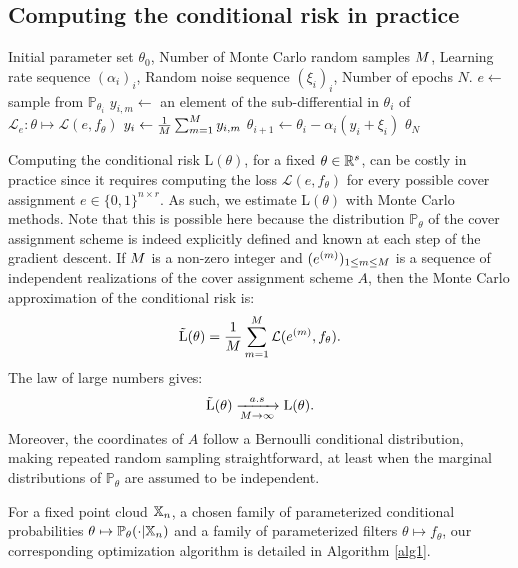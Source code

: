 \subsection{Computing the conditional risk in practice}

\begin{algorithm}[H]
\caption{Soft Mapper Optimization Algorithm}\label{alg1}
\begin{algorithmic}
\Require Initial parameter set $\theta_0$, Number of Monte Carlo random samples $M$, Learning rate sequence $(\alpha_i)_i$, Random noise sequence $(\xi_i)_i$, Number of epochs $N$.
    \State $e \gets $ sample from $\mathbb{P}_{\theta_i}$ %
    \State $y_{i,m} \gets$ an element of the sub-differential in $\theta_i$ of $\mathcal{L}_e\colon\theta\mapsto \mathcal{L}(e,f_\theta)$
\EndFor
\State $y_i \gets \frac{1}{M}\sum_{m=1}^{M}y_{i,m}$
\State $\theta_{i+1}\gets \theta_i -\alpha_i(y_i+\xi_i)$
\EndFor
{} $\theta_N$
\end{algorithmic}
\end{algorithm}


Computing the conditional risk L$(\theta)$, for a fixed $\theta\in\mathbb{R}^s$, can be costly in practice since it requires computing the loss $\mathcal{L}(e,f_\theta)$ for every possible cover assignment $e\in\{0,1\}^{n\times r}$. As such, we estimate L$(\theta)$ with Monte Carlo methods. Note that this is possible here because the distribution $\mathbb{P}_\theta$  of the cover assignment scheme is indeed explicitly defined and known at each step of the gradient descent. If $M$ is a non-zero integer and $(e^{(m)})_{1\leq m\leq M}$ is a sequence of independent realizations of the cover assignment scheme $A$, then the Monte Carlo approximation of the conditional risk is:
$$\Tilde{\text{L}}(\theta)=\frac{1}{M}\sum_{m=1}^{M}\mathcal{L}(e^{(m)},f_\theta).$$
The law of large numbers gives: 
$$\Tilde{\text{L}}(\theta)\xrightarrow[M \to \infty]{a.s}\text{L}(\theta).$$
\noindent Moreover, the coordinates of $A$ follow a Bernoulli conditional distribution, making repeated random sampling straightforward, at least when the marginal distributions of $\mathbb{P}_\theta$ are assumed to be independent. 

For a fixed point cloud $\mathbb{X}_n$, a chosen family of parameterized conditional probabilities $\theta \mapsto \mathbb{P}_\theta(\cdot |\mathbb{X}_n ) $ and a family of parameterized filters $\theta \mapsto f_\theta$, our corresponding optimization algorithm is detailed in Algorithm \ref{alg1}.

 
